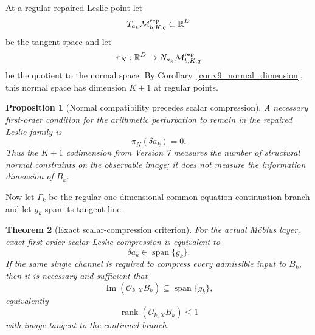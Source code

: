 \documentclass[11pt]{amsart}
\numberwithin{equation}{section}
\theoremstyle{plain}
\newtheorem{theorem}{Theorem}[section]
\newtheorem{proposition}[theorem]{Proposition}
\theoremstyle{definition}
\theoremstyle{remark}
\begin{document}
At a regular repaired Leslie point let
\[
T_{a_k}\mathcal M^{\rm rep}_{b,K,q}\subset\mathbb R^D
\]
be the tangent space and let
\[
\pi_N:\mathbb R^D\to
N_{a_k}\mathcal M^{\rm rep}_{b,K,q}
\]
be the quotient to the normal space.  By Corollary~\ref{cor:v9_normal_dimension}, this normal
space has dimension $K+1$ at regular points.

\begin{proposition}[Normal compatibility precedes scalar compression]
\label{prop:v9_normal_compatibility_observable}
A necessary first-order condition for the arithmetic perturbation to remain in the repaired
Leslie family is
\begin{equation}
\boxed{
\pi_N(\delta a_k)=0.
}
\label{eq:v9_normal_obstruction}
\end{equation}
Thus the $K+1$ codimension from Version 7 measures the number of structural normal constraints on
the \emph{observable image}; it does not measure the information dimension of $B_k$.
\end{proposition}

Now let $\Gamma_k$ be the regular one-dimensional common-equation continuation branch and let
$g_k$ span its tangent line.

\begin{theorem}[Exact scalar-compression criterion]
\label{thm:v9_scalar_compression_criterion}
For the actual M\"obius layer, exact first-order scalar Leslie compression is equivalent to
\begin{equation}
\boxed{\delta a_k\in\operatorname{span}\{g_k\}.}
\label{eq:v9_scalar_actual_condition}
\end{equation}
If the same single channel is required to compress \emph{every} admissible input to $B_k$, then
it is necessary and sufficient that
\begin{equation}
\boxed{
\operatorname{Im}(\mathcal O_{k,X}B_k)
\subseteq\operatorname{span}\{g_k\},
}
\label{eq:v9_image_rank1_condition}
\end{equation}
equivalently
\begin{equation}
\operatorname{rank}(\mathcal O_{k,X}B_k)\le1
\label{eq:v9_rank1_condition}
\end{equation}
with image tangent to the continued branch.
\end{theorem}
\end{document}
